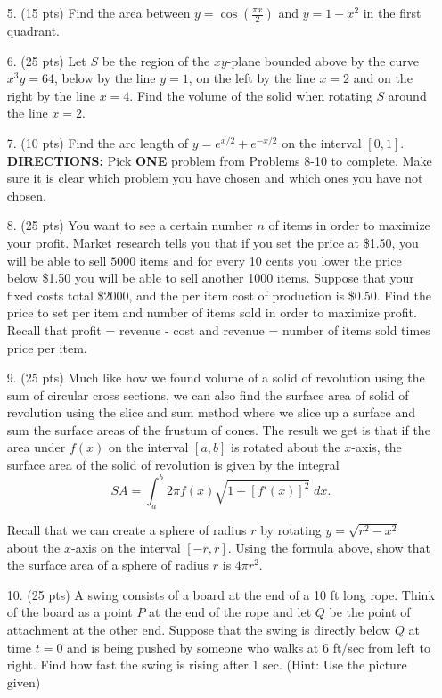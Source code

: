 \documentclass[11pt,reqno]{article}
\theoremstyle{definition}
\begin{document}
\begin{enumerate}
\begin{enumerate}
		\end{enumerate}
		\newpage
		\item[5.] (15 pts) Find the area between $y = \cos\left(\frac{\pi x}{2}\right)$ and $y = 1 - x^2$ in the first quadrant. 
		\newpage
		\item[6.] (25 pts) Let $S$ be the region of the $xy$-plane bounded above by the curve $x^3y = 64$, below by the line $y = 1$, on the left by the line $x = 2$ and on the right by the line $x = 4$. Find the volume of the solid when rotating $S$ around the line $x = 2$. 
		\newpage
		\item[7.] (10 pts) Find the arc length of $y = e^{x/2} + e^{-x/2}$ on the interval $[0, 1]$. 
		\newpage
		\textbf{DIRECTIONS:} Pick \textbf{ONE} problem from Problems 8-10 to complete. Make sure it is clear which problem you have chosen and which ones you have not chosen. 
		\item[8.] (25 pts) You want to see a certain number $n$ of items in order to maximize your profit. Market research tells you that if you set the price at \$1.50, you will be able to sell $5000$ items and for every 10 cents you lower the price below \$1.50 you will be able to sell another 1000 items. Suppose that your fixed costs total \$2000, and the per item cost of production is \$0.50. Find the price to set per item and number of items sold in order to maximize profit. Recall that profit = revenue - cost and revenue = number of items sold times price per item.
		\newpage
		\item[9.] (25 pts) Much like how we found volume of a solid of revolution using the sum of circular cross sections, we can also find the surface area of solid of revolution using the slice and sum method where we slice up a surface and sum the surface areas of the frustum of cones. The result we get is that if the area under $f(x)$ on the interval $[a, b]$ is rotated about the $x$-axis, the surface area of the solid of revolution is given by the integral 
		$$ SA = \int_{a}^{b} 2\pi f(x) \sqrt{1 + [f'(x)]^2} \; dx.$$
		
		Recall that we can create a sphere of radius $r$ by rotating $y = \sqrt{r^2 - x^2}$ about the $x$-axis on the interval $[-r, r]$. Using the formula above, show that the surface area of a sphere of radius $r$ is $4 \pi r^2$. 
		\newpage
		\item[10.] (25 pts) A swing consists of a board at the end of a 10 ft long rope. Think of the board as a point $P$ at the end of the rope and let $Q$ be the point of attachment at the other end. Suppose that the swing is directly below $Q$ at time $t = 0$ and is being pushed by someone who walks at 6 ft/sec from left to right. Find how fast the swing is rising after 1 sec. (Hint: Use the picture given) 
		

\end{enumerate}
\end{document}
